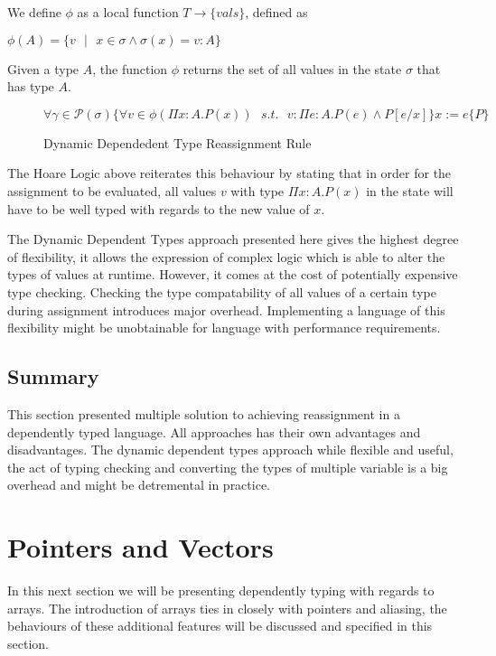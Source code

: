 \documentclass[a4paper,12pt]{report}
\begin{document}
\par
We define $\phi$ as a local function $T \longrightarrow \{vals\}$, defined as 

\begin{center}
  $\phi(A) = \{v\text{ }|\text{ }x \in \sigma \wedge \sigma(x) = v : A\}$  
\end{center}

\par
Given a type $A$, the function $\phi$ returns the set of all values in the 
state $\sigma$ that has type $A$.

\begin{figure}[H]
  \begin{center}
    $\forall \gamma \in \mathcal{P}(\sigma)\{\forall v \in \phi(\Pi x : A.P(x)) 
    \text{ }s.t.\text{ }v : \Pi e : A. P(e) \wedge P[e/x]\}
    x:= e\{P\}$ 
  \end{center}
  \caption{Dynamic Dependedent Type Reassignment Rule}
\end{figure}


\par
The Hoare Logic above reiterates this behaviour by stating that in order for the 
assignment to be evaluated, all values $v$ with type $\Pi x : A.P(x)$ in the state 
will have to be well typed with regards to the new value of $x$.

\par
The Dynamic Dependent Types approach presented here gives the highest degree of 
flexibility, it allows the expression of complex logic which is able to alter 
the types of values at runtime. However, it comes at the cost of potentially 
expensive type checking. Checking the type compatability of all values of a 
certain type during assignment introduces major overhead. Implementing a 
language of this flexibility might be unobtainable for language with performance 
requirements. 

\subsection{Summary}
This section presented multiple solution to achieving reassignment in a 
dependently typed language. All approaches has their own advantages and 
disadvantages. The dynamic dependent types approach while flexible and useful, 
the act of typing checking and converting the types of multiple variable is a 
big overhead and might be detremental in practice. 

\section{Pointers and Vectors}
In this next section we will be presenting dependently typing with regards to 
arrays. The introduction of arrays ties in closely with pointers and aliasing, 
the behaviours of these additional features will be discussed and specified in this 
section.
\end{document}
